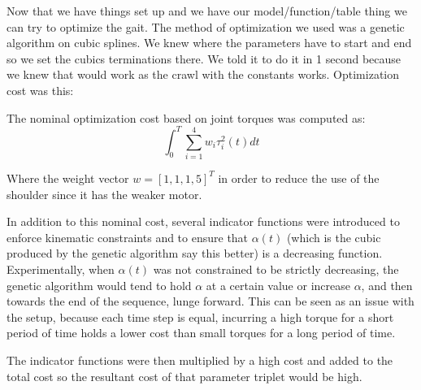 Now that we have things set up and we have our model/function/table thing we can try to optimize the gait.
The method of optimization we used was a genetic algorithm on cubic splines. We knew where the parameters have to start
and end so we set the cubics terminations there. We told it to do it in 1 second because we knew that would work
as the crawl with the constants works.
Optimization cost was this: 

The nominal optimization cost based on joint torques was computed as:
\begin{equation}
	\int_0^T \sum_{i=1}^4 w_i \tau_i^2(t) dt
\end{equation}

Where the weight vector $w = [1, 1, 1, 5]^T$ in order to reduce the use of the shoulder since it has the
weaker motor.

In addition to this nominal cost, several indicator functions were introduced to enforce kinematic
constraints and to ensure that $\alpha(t)$ (which is the cubic produced by the genetic algorithm say this better) is a decreasing function. Experimentally, when $\alpha(t)$ was not 
constrained to be strictly decreasing, the genetic algorithm would tend to hold $\alpha$ at a certain value or
increase $\alpha$, and then towards the end of the sequence, lunge forward.
This can be seen as an issue with the setup, because each time step is equal, incurring a high torque for a short
period of time holds a lower cost than small torques for a long period of time.

The indicator functions were then multiplied by a high cost and added to the total cost so the resultant
cost of that parameter triplet would be high.

